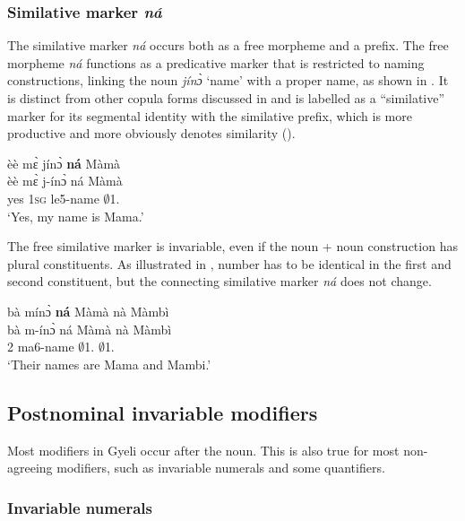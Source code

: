 

\subsubsection{Similative marker {\itshape ná}}
\label{sec:SIMword}

The similative marker {\itshape ná} occurs both as a free morpheme and a prefix. The free morpheme {\itshape ná} functions as a predicative marker that is restricted to naming constructions, linking the noun {\itshape jínɔ̀} `name' with a proper name, as shown in . It is distinct from other copula forms discussed in  and is labelled as a ``similative'' marker for its segmental identity with the similative prefix, which is more productive and more obviously denotes similarity (). 


\ea \label{SIMword}
  \glll èè mɛ̀ jínɔ̀ {\bfseries ná} Màmà \\
         èè mɛ̀ j-ínɔ̀ ná Màmà \\
       yes 1\textsc{sg} le5-name {\SIM} $\emptyset$1.{\PN}  \\
    \trans `Yes, my name is Mama.'
\z

The free similative marker is invariable, even if the noun + noun construction has plural constituents. As illustrated in , number has to be identical in the first and second constituent, but the connecting similative marker {\itshape ná} does not change.

\ea \label{SIMword2}
  \glll bà mínɔ̀ {\bfseries ná} Màmà nà Màmbì \\
         bà m-ínɔ̀ ná Màmà nà Màmbì \\
        2 ma6-name {\SIM} $\emptyset$1.{\PN}  {\CONJ} $\emptyset$1.{\PN} \\
    \trans `Their names are Mama and Mambi.'
\z






\subsection{Postnominal invariable modifiers}
\label{sec:InvQUANT2}

Most modifiers in Gyeli occur after the noun. This is also true for most non-agreeing modifiers, such as invariable numerals and some quantifiers.

\subsubsection{Invariable numerals} 
\label{sec:InvNUM}


